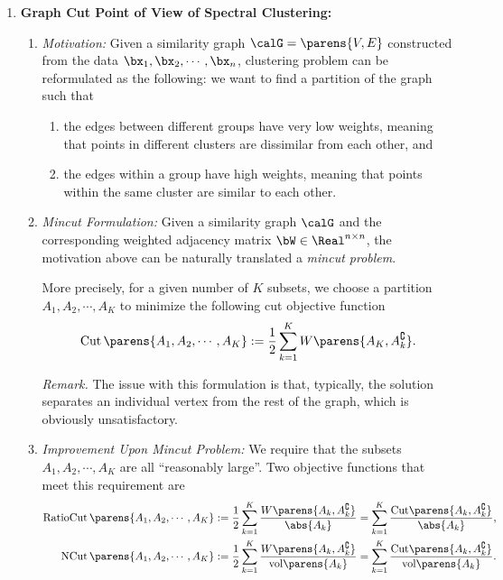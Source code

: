 \documentclass[12pt]{article}
\begin{document}
\begin{enumerate}[label=\textbf{\arabic*.}]
	\item \textbf{Graph Cut Point of View of Spectral Clustering:} 
	\begin{enumerate}
		\item \textit{Motivation:} Given a similarity graph $\calG = \parens{V, E}$ constructed from the data $\bx_1, \bx_2, \cdots, \bx_n$, clustering problem can be reformulated as the following: we want to find a partition of the graph such that 
		\begin{enumerate}
			\item the edges between different groups have very low weights, meaning that points in different clusters are dissimilar from each other, and 
			\item the edges within a group have high weights, meaning that points within the same cluster are similar to each other. 
		\end{enumerate}
		
		\item \textit{Mincut Formulation:} Given a similarity graph $\calG$ and the corresponding weighted adjacency matrix $\bW \in \Real^{n \times n}$, the motivation above can be naturally translated a \emph{mincut problem}. 
		
		More precisely, for a given number of $K$ subsets, we choose a partition $A_1, A_2, \cdots, A_K$ to minimize the following cut objective function 
		\begin{align}
			\mathrm{Cut} \, \parens{A_1, A_2, \cdots, A_K} := \frac{1}{2} \sum_{k=1}^K W \parens{A_K, A_k^{\complement}}. 
		\end{align}
		
		\textit{Remark.} The issue with this formulation is that, typically, the solution separates an individual vertex from the rest of the graph, which is obviously unsatisfactory. 
		
		\item \textit{Improvement Upon Mincut Problem:} We require that the subsets $A_1, A_2, \cdots, A_K$ are all ``reasonably large''. Two objective functions that meet this requirement are 
		\begin{align}
			\mathrm{RatioCut} \, \parens{A_1, A_2, \cdots, A_K} := \frac{1}{2} \sum_{k=1}^K \frac{W \parens{A_k, A_k^{\complement}}}{\abs{A_k}} = \sum_{k=1}^K \frac{ \mathrm{Cut} \parens{A_k, A_k^{\complement}}}{\abs{A_k}}, \\ 
			\mathrm{NCut} \, \parens{A_1, A_2, \cdots, A_K} := \frac{1}{2} \sum_{k=1}^K \frac{W \parens{A_k, A_k^{\complement}}}{\mathrm{vol} \parens{A_k}} = \sum_{k=1}^K \frac{ \mathrm{Cut} \parens{A_k, A_k^{\complement}}}{\mathrm{vol} \parens{A_k}}. 
		\end{align}
		

\end{enumerate}
\end{enumerate}
\end{document}
